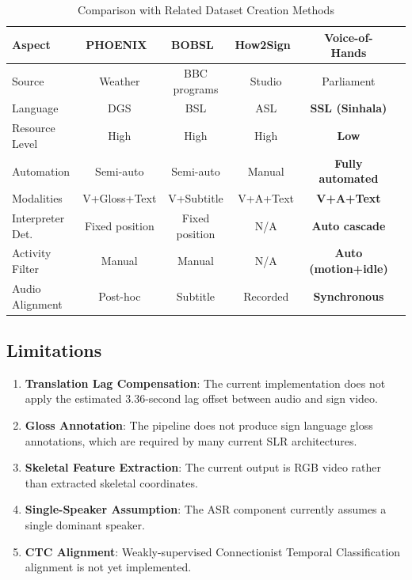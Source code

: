 \documentclass[journal]{IEEEtran}
\begin{document}
\begin{table}[htbp]
\centering
\caption{Comparison with Related Dataset Creation Methods}
\label{tab:comparison}
\begin{tabular}{@{}lccccc@{}}
\toprule
\textbf{Aspect} & \textbf{PHOENIX}~\cite{camgoz2018neural} & \textbf{BOBSL}~\cite{albanie2021bobsl} & \textbf{How2Sign}~\cite{duarte2021how2sign} & \textbf{Voice-of-Hands} \\ \midrule
Source & Weather & BBC programs & Studio & Parliament \\
Language & DGS & BSL & ASL & \textbf{SSL (Sinhala)} \\
Resource Level & High & High & High & \textbf{Low} \\
Automation & Semi-auto & Semi-auto & Manual & \textbf{Fully automated} \\
Modalities & V+Gloss+Text & V+Subtitle & V+A+Text & \textbf{V+A+Text} \\
Interpreter Det. & Fixed position & Fixed position & N/A & \textbf{Auto cascade} \\
Activity Filter & Manual & Manual & N/A & \textbf{Auto (motion+idle)} \\
Audio Alignment & Post-hoc & Subtitle & Recorded & \textbf{Synchronous} \\
\bottomrule
\end{tabular}
\end{table}

\subsection{Limitations}

\begin{enumerate}
    \item \textbf{Translation Lag Compensation}: The current implementation does not apply the estimated 3.36-second lag offset between audio and sign video.
    
    \item \textbf{Gloss Annotation}: The pipeline does not produce sign language gloss annotations, which are required by many current SLR architectures.
    
    \item \textbf{Skeletal Feature Extraction}: The current output is RGB video rather than extracted skeletal coordinates.
    
    \item \textbf{Single-Speaker Assumption}: The ASR component currently assumes a single dominant speaker.
    
    \item \textbf{CTC Alignment}: Weakly-supervised Connectionist Temporal Classification alignment is not yet implemented.
\end{enumerate}
\end{document}

